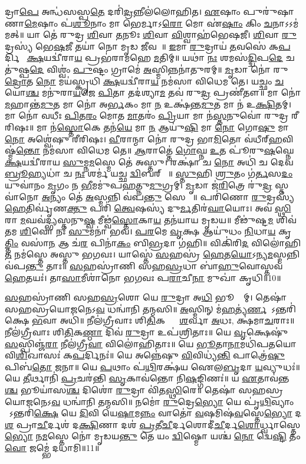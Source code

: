 𑌦𑍍𑌰𑌾\ul{𑌪𑍇} 𑌅𑌨𑍍𑌧॑𑌸𑌸𑍍𑌪\ul{𑌤𑍇} 𑌦𑌰𑌿॑\ul{𑌦𑍍𑌰}𑌨𑍍𑌨𑍀𑌲॑𑌲𑍋𑌹𑌿𑌤। \ul{𑌏}𑌷𑌾𑌂 𑌪𑍁𑌰𑍁॑𑌷𑌾𑌣𑌾\ul{𑌮𑍇}𑌷𑌾𑌂 𑌪॑\ul{𑌶𑍂}𑌨𑌾𑌂 𑌮𑌾 𑌭𑍇𑌰𑍍𑌮𑌾𑌽\ul{𑌰𑍋} 𑌮𑍋 𑌏॑\ul{𑌷𑌾𑌂} 𑌕𑌿𑌂 \ul{𑌚}𑌨𑌾𑌽𑌽𑌮॑𑌮𑌤𑍍॥ 𑌯𑌾 𑌤𑍇॑ 𑌰𑍁𑌦𑍍𑌰 \ul{𑌶𑌿}𑌵𑌾 \ul{𑌤}𑌨𑍂𑌃 \ul{𑌶𑌿}𑌵𑌾 \ul{𑌵𑌿}𑌶𑍍𑌵𑌾𑌹॑𑌭𑍇𑌷𑌜𑍀। \ul{𑌶𑌿}𑌵𑌾 \ul{𑌰𑍁}𑌦𑍍𑌰𑌸𑍍𑌯॑ 𑌭𑍇\ul{𑌷}𑌜𑍀 𑌤𑌯𑌾॑ 𑌨𑍋 𑌮𑍃𑌡 \ul{𑌜𑍀}𑌵𑌸𑍇᳚॥ \ul{𑌇}𑌮𑌾 \ul{𑌰𑍁}𑌦𑍍𑌰𑌾𑌯॑ \ul{𑌤}𑌵𑌸𑍇॑ 𑌕\ul{𑌪}𑌰𑍍𑌦𑌿𑌨𑍇᳚ \ul{𑌕𑍍𑌷}𑌯𑌦𑍍𑌵𑍀॑𑌰𑌾\ul{𑌯} 𑌪𑍍𑌰𑌭॑𑌰𑌾𑌮𑌹𑍇 \ul{𑌮}𑌤𑌿𑌮𑍍॥ 𑌯𑌥𑌾॑ \ul{𑌨𑌃} 𑌶𑌮𑌸॑\ul{𑌦𑍍𑌦𑍍𑌵𑌿}𑌪\ul{𑌦𑍇} 𑌚𑌤𑍁॑𑌷𑍍𑌪\ul{𑌦𑍇} 𑌵𑌿𑌶𑍍𑌵𑌂॑ \ul{𑌪𑍁}𑌷𑍍𑌟𑌂 𑌗𑍍𑌰𑌾𑌮𑍇॑ \ul{𑌅}𑌸𑍍𑌮𑌿𑌨𑍍𑌨𑌨𑌾॑𑌤𑍁𑌰𑌮𑍍॥ \ul{𑌮𑍃}𑌡𑌾 𑌨𑍋॑ 𑌰𑍁\ul{𑌦𑍍𑌰𑍋}𑌤 \ul{𑌨𑍋} 𑌮𑌯॑𑌸𑍍𑌕𑍃𑌧𑌿 \ul{𑌕𑍍𑌷}𑌯𑌦𑍍𑌵𑍀॑𑌰𑌾\ul{𑌯} 𑌨𑌮॑𑌸𑌾 𑌵𑌿𑌧𑍇𑌮 𑌤𑍇। 𑌯𑌚𑍍𑌛𑌂 \ul{𑌚} 𑌯𑍋\ul{𑌶𑍍𑌚} 𑌮𑌨𑍁॑𑌰𑌾\ul{𑌯}𑌜𑍇 \ul{𑌪𑌿}𑌤𑌾 𑌤𑌦॑𑌶𑍍𑌯𑌾\ul{𑌮} 𑌤𑌵॑ 𑌰𑍁\ul{𑌦𑍍𑌰} 𑌪𑍍𑌰𑌣𑍀॑𑌤𑍗॥ 𑌮𑌾 𑌨𑍋॑ \ul{𑌮}𑌹𑌾𑌨𑍍𑌤॑\ul{𑌮𑍁}𑌤 𑌮𑌾 𑌨𑍋॑ 𑌅\ul{𑌰𑍍𑌭}𑌕𑌂 𑌮𑌾 \ul{𑌨} 𑌉𑌕𑍍𑌷॑𑌨𑍍𑌤\ul{𑌮𑍁}𑌤 𑌮𑌾 𑌨॑ 𑌉\ul{𑌕𑍍𑌷𑌿}𑌤𑌮𑍍। 𑌮𑌾 𑌨𑍋॑ 𑌵𑌧𑍀𑌃 \ul{𑌪𑌿}𑌤\ul{𑌰𑌂} 𑌮𑍋𑌤 \ul{𑌮𑌾}𑌤𑌰𑌂॑ \ul{𑌪𑍍𑌰𑌿}𑌯𑌾 𑌮𑌾 𑌨॑\ul{𑌸𑍍𑌤}𑌨𑍁𑌵𑍋॑ 𑌰𑍁𑌦𑍍𑌰 𑌰𑍀𑌰𑌿𑌷𑌃॥ 𑌮𑌾 𑌨॑\ul{𑌸𑍍𑌤𑍋}𑌕𑍇 𑌤𑌨॑\ul{𑌯𑍇} 𑌮𑌾 \ul{𑌨} 𑌆𑌯𑍁॑\ul{𑌷𑌿} 𑌮𑌾 \ul{𑌨𑍋} 𑌗𑍋\ul{𑌷𑍁} 𑌮𑌾 \ul{𑌨𑍋} 𑌅𑌶𑍍𑌵𑍇॑𑌷𑍁 𑌰𑍀𑌰𑌿𑌷𑌃। \ul{𑌵𑍀}𑌰𑌾𑌨𑍍𑌮𑌾 𑌨𑍋॑ 𑌰𑍁𑌦𑍍𑌰 𑌭𑌾\ul{𑌮𑌿}𑌤𑍋 𑌵॑𑌧𑍀𑌰𑍍‌\ul{𑌹}𑌵𑌿𑌷𑍍𑌮॑\ul{𑌨𑍍𑌤𑍋} 𑌨𑌮॑𑌸𑌾 𑌵𑌿𑌧𑍇𑌮 𑌤𑍇॥ \ul{𑌆}𑌰𑌾𑌤𑍍𑌤𑍇॑ \ul{𑌗𑍋}𑌘𑍍𑌨 \ul{𑌉}𑌤 𑌪𑍂॑𑌰𑍁\ul{𑌷}𑌘𑍍𑌨𑍇 \ul{𑌕𑍍𑌷}𑌯𑌦𑍍𑌵𑍀॑𑌰𑌾𑌯 \ul{𑌸𑍁}𑌮𑍍𑌨\ul{𑌮}𑌸𑍍𑌮𑍇 𑌤𑍇॑ 𑌅𑌸𑍍𑌤𑍁। 𑌰𑌕𑍍𑌷𑌾॑ 𑌚 \ul{𑌨𑍋} 𑌅𑌧𑌿॑ 𑌚 𑌦𑍇𑌵 \ul{𑌬𑍍𑌰𑍂}𑌹𑍍𑌯𑌧𑌾॑ 𑌚 \ul{𑌨𑌃} 𑌶𑌰𑍍𑌮॑ 𑌯𑌚𑍍𑌛 \ul{𑌦𑍍𑌵𑌿}𑌬𑌰𑍍‌𑌹𑌾𑌃᳚॥ \ul{𑌸𑍍𑌤𑍁}𑌹𑌿 \ul{𑌶𑍍𑌰𑍁}𑌤𑌂 𑌗॑\ul{𑌰𑍍𑌤}𑌸\ul{𑌦𑌂} 𑌯𑍁𑌵𑌾॑𑌨𑌂 \ul{𑌮𑍃}𑌗𑌂 𑌨 \ul{𑌭𑍀}𑌮𑌮𑍁॑𑌪\ul{𑌹}𑌤𑍍𑌨𑍁\ul{𑌮𑍁}𑌗𑍍𑌰𑌮𑍍। \ul{𑌮𑍃}𑌡𑌾 𑌜॑\ul{𑌰𑌿}𑌤𑍍𑌰𑍇 𑌰𑍁॑\ul{𑌦𑍍𑌰} 𑌸𑍍𑌤𑌵𑌾॑𑌨𑍋 \ul{𑌅}𑌨𑍍𑌯𑌂 𑌤𑍇॑ \ul{𑌅}𑌸𑍍𑌮𑌨𑍍𑌨𑌿 𑌵॑𑌪\ul{𑌨𑍍𑌤𑍁} 𑌸𑍇𑌨𑌾𑌃᳚॥ 𑌪𑌰𑌿॑𑌣𑍋 \ul{𑌰𑍁}𑌦𑍍𑌰𑌸𑍍𑌯॑ \ul{𑌹𑍇}𑌤𑌿𑌰𑍍𑌵𑍃॑𑌣\ul{𑌕𑍍𑌤𑍁} 𑌪𑌰𑌿॑ \ul{𑌤𑍍𑌵𑍇}𑌷𑌸𑍍𑌯॑ 𑌦𑍁\ul{𑌰𑍍𑌮}𑌤𑌿𑌰॑\ul{𑌘𑌾}𑌯𑍋𑌃। 𑌅𑌵॑ \ul{𑌸𑍍𑌥𑌿}𑌰𑌾 \ul{𑌮}𑌘𑌵॑𑌦𑍍𑌭𑍍𑌯𑌸𑍍𑌤𑌨𑍁\ul{𑌷𑍍𑌵} 𑌮𑍀𑌢𑍍𑌵॑\ul{𑌸𑍍𑌤𑍋}𑌕𑌾\ul{𑌯} 𑌤𑌨॑𑌯𑌾𑌯 𑌮𑍃𑌡𑌯॥ 𑌮𑍀𑌢𑍁॑𑌷𑍍𑌟\ul{𑌮} 𑌶𑌿𑌵॑𑌤𑌮 \ul{𑌶𑌿}𑌵𑍋 𑌨𑌃॑ \ul{𑌸𑍁}𑌮𑌨𑌾॑ 𑌭𑌵। \ul{𑌪}\ul{𑌰}𑌮𑍇 \ul{𑌵𑍃}𑌕𑍍𑌷 𑌆𑌯𑍁॑𑌧𑌂 \ul{𑌨𑌿}𑌧𑌾\ul{𑌯} 𑌕𑍃\ul{𑌤𑍍𑌤𑌿𑌂} 𑌵𑌸𑌾॑\ul{𑌨} 𑌆 𑌚॑\ul{𑌰} 𑌪𑌿𑌨𑌾॑\ul{𑌕𑌂} 𑌬𑌿\ul{𑌭𑍍𑌰}𑌦𑌾 𑌗॑𑌹𑌿॥ 𑌵𑌿𑌕𑌿॑𑌰𑌿\ul{𑌦} 𑌵𑌿𑌲𑍋॑𑌹𑌿\ul{𑌤} 𑌨𑌮॑𑌸𑍍𑌤𑍇 𑌅𑌸𑍍𑌤𑍁 𑌭𑌗𑌵𑌃। 𑌯𑌾𑌸𑍍𑌤𑍇॑ \ul{𑌸}𑌹𑌸𑍍𑌰॑ \ul{𑌹𑍇}𑌤\ul{𑌯𑍋}𑌽𑌨𑍍𑌯\ul{𑌮}𑌸𑍍𑌮𑌨𑍍𑌨𑌿 𑌵॑𑌪\ul{𑌨𑍍𑌤𑍁} 𑌤𑌾𑌃॥ \ul{𑌸}𑌹𑌸𑍍𑌰𑌾॑𑌣𑌿 𑌸𑌹\ul{𑌸𑍍𑌰}𑌧𑌾 𑌬𑌾॑\ul{𑌹𑍁}𑌵𑍋𑌸𑍍𑌤𑌵॑ \ul{𑌹𑍇}𑌤𑌯𑌃॑। 𑌤𑌾\ul{𑌸𑌾}𑌮𑍀𑌶𑌾॑𑌨𑍋 𑌭𑌗𑌵𑌃 𑌪\ul{𑌰𑌾}𑌚𑍀\ul{𑌨𑌾} 𑌮𑍁𑌖𑌾॑ 𑌕𑍃𑌧𑌿॥10॥ 

\ul{𑌸}𑌹𑌸𑍍𑌰𑌾॑𑌣𑌿 𑌸𑌹\ul{𑌸𑍍𑌰}𑌶𑍋 𑌯𑍇 \ul{𑌰𑍁}𑌦𑍍𑌰𑌾 𑌅\ul{𑌧𑌿} 𑌭𑍂𑌮𑍍𑌯𑌾᳚𑌮𑍍। 𑌤𑍇𑌷𑌾॑ 𑌸𑌹𑌸𑍍𑌰𑌯𑍋\ul{𑌜}𑌨𑍇𑌽\ul{𑌵} 𑌧𑌨𑍍𑌵𑌾॑𑌨𑌿 𑌤𑌨𑍍𑌮𑌸𑌿॥ \ul{𑌅}𑌸𑍍𑌮𑌿𑌨𑍍 𑌮॑\ul{𑌹}𑌤𑍍𑌯॑\ul{𑌰𑍍𑌣}𑌵𑍇᳚\-𑌽𑌨𑍍𑌤𑌰𑌿॑𑌕𑍍𑌷𑍇 \ul{𑌭}𑌵𑌾 𑌅𑌧𑌿॑॥ 𑌨𑍀𑌲॑𑌗𑍍𑌰𑍀𑌵𑌾𑌃 𑌶𑌿\ul{𑌤𑌿}𑌕𑌣𑍍𑌠𑌾𑌃᳚ \ul{𑌶}𑌰𑍍𑌵𑌾 \ul{𑌅}𑌧𑌃, 𑌕𑍍𑌷॑𑌮𑌾\ul{𑌚}𑌰𑌾𑌃॥ 𑌨𑍀𑌲॑𑌗𑍍𑌰𑍀𑌵𑌾𑌃 𑌶𑌿\ul{𑌤𑌿}𑌕\ul{𑌣𑍍𑌠𑌾} 𑌦𑌿𑌵॑ \ul{𑌰𑍁}𑌦𑍍𑌰𑌾 𑌉𑌪॑𑌶𑍍𑌰𑌿𑌤𑌾𑌃॥ 𑌯𑍇 \ul{𑌵𑍃}𑌕𑍍𑌷𑍇𑌷𑍁॑ \ul{𑌸}𑌸𑍍𑌪𑌿𑌞𑍍𑌜॑\ul{𑌰𑌾} 𑌨𑍀𑌲॑𑌗𑍍𑌰𑍀\ul{𑌵𑌾} 𑌵𑌿𑌲𑍋॑𑌹𑌿𑌤𑌾𑌃॥ 𑌯𑍇 \ul{𑌭𑍂}𑌤𑌾\ul{𑌨𑌾}𑌮𑌧𑌿॑𑌪𑌤𑌯𑍋 𑌵𑌿\ul{𑌶𑌿}𑌖𑌾𑌸𑌃॑ 𑌕\ul{𑌪}𑌰𑍍𑌦𑌿𑌨𑌃॑॥ 𑌯𑍇 𑌅𑌨𑍍𑌨𑍇॑𑌷𑍁 \ul{𑌵𑌿}𑌵𑌿𑌧𑍍𑌯॑\ul{𑌨𑍍𑌤𑌿} 𑌪𑌾𑌤𑍍𑌰𑍇॑\ul{𑌷𑍁} 𑌪𑌿𑌬॑\ul{𑌤𑍋} 𑌜𑌨𑌾\sn ॥ 𑌯𑍇 \ul{𑌪}𑌥𑌾𑌂 𑌪॑\ul{𑌥𑌿}𑌰𑌕𑍍𑌷॑𑌯 𑌐𑌲\ul{𑌬𑍃}𑌦𑌾 \ul{𑌯}𑌵𑍍𑌯𑍁𑌧𑌃॑॥ 𑌯𑍇 \ul{𑌤𑍀}𑌰𑍍𑌥𑌾𑌨𑌿॑ \ul{𑌪𑍍𑌰}𑌚𑌰॑𑌨𑍍𑌤𑌿 \ul{𑌸𑍃}𑌕𑌾𑌵॑𑌨𑍍𑌤𑍋 𑌨𑌿\ul{𑌷}𑌙𑍍𑌗𑌿𑌣𑌃॑॥ 𑌯 \ul{𑌏}𑌤𑌾𑌵॑𑌨𑍍𑌤\ul{𑌶𑍍𑌚} 𑌭𑍂𑌯𑌾॑𑌸\ul{𑌶𑍍𑌚} 𑌦𑌿𑌶𑍋॑ \ul{𑌰𑍁}𑌦𑍍𑌰𑌾 𑌵𑌿॑𑌤\ul{𑌸𑍍𑌥𑌿}𑌰𑍇॥ 𑌤𑍇𑌷𑌾॑ 𑌸𑌹𑌸𑍍𑌰𑌯𑍋\ul{𑌜}𑌨𑍇𑌽\ul{𑌵} 𑌧𑌨𑍍𑌵𑌾॑𑌨𑌿 𑌤𑌨𑍍𑌮𑌸𑌿॥ 𑌨𑌮𑍋॑ \ul{𑌰𑍁}𑌦𑍍𑌰𑍇\ul{𑌭𑍍𑌯𑍋} 𑌯𑍇 𑌪𑍃॑\ul{𑌥𑌿}𑌵𑍍𑌯𑌾𑌂 𑌯𑍇᳚𑌽𑌨𑍍𑌤𑌰𑌿॑\ul{𑌕𑍍𑌷𑍇} 𑌯𑍇 \ul{𑌦𑌿}𑌵𑌿 𑌯𑍇\ul{𑌷𑌾}𑌮\ul{𑌨𑍍𑌨𑌂} 𑌵𑌾𑌤𑍋॑ \ul{𑌵}\ar 𑌷𑌮𑌿𑌷॑\ul{𑌵}𑌸𑍍𑌤𑍇\ul{𑌭𑍍𑌯𑍋} 𑌦\ul{𑌶} 𑌪𑍍𑌰𑌾\ul{𑌚𑍀}𑌰𑍍𑌦𑌶॑ 𑌦\ul{𑌕𑍍𑌷𑌿}𑌣𑌾 𑌦𑌶॑ \ul{𑌪𑍍𑌰}𑌤𑍀\ul{𑌚𑍀}𑌰𑍍𑌦𑌶𑍋\-𑌦𑍀॑\ul{𑌚𑍀}𑌰𑍍𑌦\ul{𑌶𑍋}𑌰𑍍𑌧𑍍𑌵𑌾𑌸𑍍𑌤𑍇\ul{𑌭𑍍𑌯𑍋} 𑌨\ul{𑌮}𑌸𑍍𑌤𑍇 𑌨𑍋॑ 𑌮𑍃𑌡𑌯\ul{𑌨𑍍𑌤𑍁} 𑌤𑍇 𑌯𑌂 \ul{𑌦𑍍𑌵𑌿}𑌷𑍍𑌮𑍋 𑌯𑌶𑍍𑌚॑ \ul{𑌨𑍋} 𑌦𑍍𑌵𑍇\ul{𑌷𑍍𑌟𑌿} 𑌤𑌂 \ul{𑌵𑍋} 𑌜𑌮𑍍𑌭𑍇॑ 𑌦𑌧𑌾𑌮𑌿॥11॥ 

